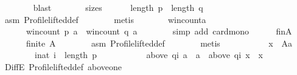 \begin{isabellebody}
\ \ \ \ \ \ \isamarkupfalse%
\ blast\isanewline
\ \ \ \ \isamarkupfalse%
\ \isamarkupfalse%
\ sizes{\isacharcolon}{\kern0pt}\isanewline
\ \ \ \ \ \ {\isachardoublequoteopen}length\ p\ {\isacharequal}{\kern0pt}\ length\ q{\isachardoublequoteclose}\isanewline
\ \ \ \ \ \ \isamarkupfalse%
\ asm{}\ Profile{\isachardot}{\kern0pt}lifted{\isacharunderscore}{\kern0pt}def\isanewline
\ \ \ \ \ \ \isamarkupfalse%
\ metis\isanewline
\ \ \ \ \isamarkupfalse%
\ \isamarkupfalse%
\ win{\isacharunderscore}{\kern0pt}count{\isacharunderscore}{\kern0pt}a{\isacharcolon}{\kern0pt}\isanewline
\ \ \ \ \ \ {\isachardoublequoteopen}win{\isacharunderscore}{\kern0pt}count\ p\ a\ {\isasymle}\ win{\isacharunderscore}{\kern0pt}count\ q\ a{\isachardoublequoteclose}\isanewline
\ \ \ \ \ \ \isamarkupfalse%
\ {\isacharparenleft}{\kern0pt}simp\ add{\isacharcolon}{\kern0pt}\ card{\isacharunderscore}{\kern0pt}mono{\isacharparenright}{\kern0pt}\isanewline
\ \ \ \ \isamarkupfalse%
\ fin{\isacharunderscore}{\kern0pt}A{\isacharcolon}{\kern0pt}\isanewline
\ \ \ \ \ \ {\isachardoublequoteopen}finite\ A{\isachardoublequoteclose}\isanewline
\ \ \ \ \ \ \isamarkupfalse%
\ asm{}\ Profile{\isachardot}{\kern0pt}lifted{\isacharunderscore}{\kern0pt}def\isanewline
\ \ \ \ \ \ \isamarkupfalse%
\ metis\isanewline
\ \ \ \ \isamarkupfalse%
\isanewline
\ \ \ \ \ \ {\isachardoublequoteopen}{\isasymforall}x\ {\isasymin}\ A{\isacharminus}{\kern0pt}{\isacharbraceleft}{\kern0pt}a{\isacharbraceright}{\kern0pt}{\isachardot}{\kern0pt}\isanewline
\ \ \ \ \ \ \ \ {\isasymforall}i{\isacharcolon}{\kern0pt}{\isacharcolon}{\kern0pt}nat{\isachardot}{\kern0pt}\ i\ {\isacharless}{\kern0pt}\ length\ p\ {\isasymlongrightarrow}\isanewline
\ \ \ \ \ \ \ \ \ \ {\isacharparenleft}{\kern0pt}above\ {\isacharparenleft}{\kern0pt}q{\isacharbang}{\kern0pt}i{\isacharparenright}{\kern0pt}\ a\ {\isacharequal}{\kern0pt}\ {\isacharbraceleft}{\kern0pt}a{\isacharbraceright}{\kern0pt}\ {\isasymlongrightarrow}\ above\ {\isacharparenleft}{\kern0pt}q{\isacharbang}{\kern0pt}i{\isacharparenright}{\kern0pt}\ x\ {\isasymnoteq}\ {\isacharbraceleft}{\kern0pt}x{\isacharbraceright}{\kern0pt}{\isacharparenright}{\kern0pt}{\isachardoublequoteclose}\isanewline
\ \ \ \ \ \ \isamarkupfalse%
\ DiffE\ Profile{\isachardot}{\kern0pt}lifted{\isacharunderscore}{\kern0pt}def\ above{\isacharunderscore}{\kern0pt}one{}\isanewline

\end{isabellebody}
